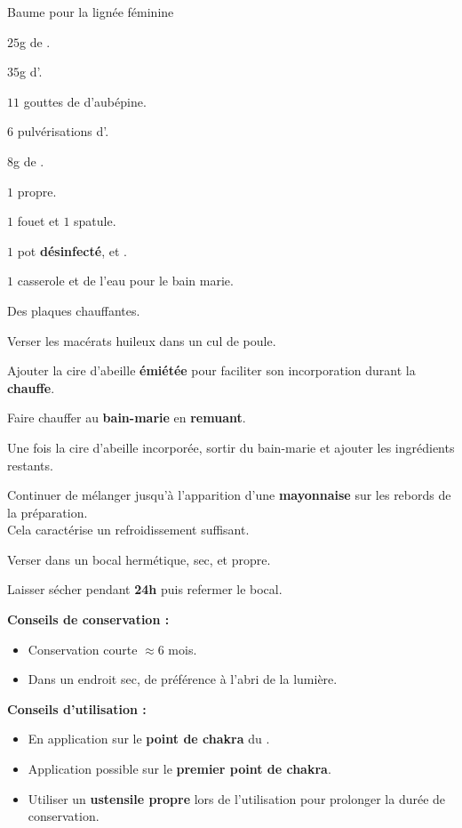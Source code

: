 
\ficherecette
{%
    Baume pour la lignée féminine
}
{%
    \item $25$g de .
    \item $35$g d'.
    \item $11$ gouttes de \teinture d'aubépine.
    \item $6$ pulvérisations d'.
    \item $8$g de .
}
{%
    \item $1$  propre. 
    \item $1$ fouet et $1$ spatule. 
    \item $1$ pot \textbf{désinfecté},  et .
    \item $1$ casserole et de l'eau pour le bain marie. 
    \item Des plaques chauffantes.  
}
{%
    \item Verser les macérats huileux dans un cul de poule. 
    \item Ajouter la cire d'abeille \textbf{émiétée} pour faciliter son incorporation durant la \textbf{chauffe}.
    \item Faire chauffer au \textbf{bain-marie} en \textbf{remuant}.
    \item Une fois la cire d'abeille incorporée, sortir du bain-marie et ajouter les ingrédients restants. 
    \item Continuer de mélanger jusqu'à l'apparition d'une \textbf{mayonnaise} sur les rebords de la préparation. \\
            Cela caractérise un refroidissement suffisant.
    \item Verser dans un bocal hermétique, sec, et propre. 
    \item Laisser sécher pendant \textbf{24h} puis refermer le bocal. 
}
{%
    \textbf{Conseils de conservation :}
    \begin{itemize}[label=\faPen]
        \item Conservation courte $\approx 6$ mois.
        \item Dans un endroit sec, de préférence à l'abri de la lumière. 
    \end{itemize}
    \textbf{Conseils d'utilisation :}
    \begin{itemize}[label=\faPen]
        \item En application sur le \textbf{point de chakra} du .
        \item Application possible sur le \textbf{premier point de chakra}.
        \item Utiliser un \textbf{ustensile propre} lors de l'utilisation pour prolonger la durée de conservation. 
    \end{itemize}
}
